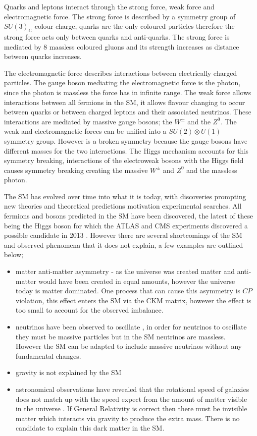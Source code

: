 Quarks and leptons interact through the strong force, weak force and electromagnetic force. The strong force is described by a symmetry group of $SU(3)_{C}$ colour charge, quarks
are the only coloured particles therefore the strong force acts only between quarks and anti-quarks. The strong force is mediated by 8 massless coloured gluons and its strength increases as distance between quarks increases. 

The electromagnetic force describes interactions between electrically charged particles. The gauge boson mediating the electromagnetic force is the photon, since the photon is massless the force
has in infinite range. 
The weak force allows interactions between all fermions in the SM, it allows flavour changing to occur between quarks or between charged leptons and their associated neutrinos. 
These interactions are mediated by massive gauge bosons; the $W^{\pm}$ and the $Z^{0}$. The weak and electromagnetic forces can be unified into a $SU(2) \otimes U(1)$ symmetry group. However 
is a broken symmetry because the gauge bosons have different masses for the two interactions. The Higgs mechanism accounts for this symmetry breaking, interactions of the electroweak bosons
with the Higgs field causes symmetry breaking creating the massive $W^{\pm}$ and $Z^{0}$ and the massless photon. 


The SM has evolved over time into what it is today, with discoveries prompting new theories and theoretical predictions motivation experimental searches. All fermions and bosons predicted in the SM have been discovered, the latest of these being the 
Higgs boson for which the ATLAS and CMS experiments discovered a possible candidate in 2013 \cite{Higgs_ATLAS, Higgs_CMS}. However there are several shortcomings of the SM and 
observed phenomena that it does not explain, a few examples are outlined below;
\begin{itemize}
 \item matter anti-matter asymmetry - as the universe was created matter and anti-matter would have been created in equal amounts, however the universe today is matter dominated. One process
that can cause this asymmetry is $CP$ violation, this effect enters the SM via the CKM matrix, however the effect is too small to account for the observed imbalance. 
 \item neutrinos have been observed to oscillate \cite{Fukuda:2001nk, Fukuda:1998fd, Davis_neutrinos}, in order for neutrinos to oscillate they must be massive particles but in the SM neutrinos are massless. However the SM can be adapted to include massive neutrinos without any fundamental changes.
 \item gravity is not explained by the SM
 \item astronomical observations have revealed that the rotational speed of galaxies does not match up with the speed expect from the amount of matter visible in the universe \cite{1973A&A,Zwicky:1933gu,1937ApJ}. 
If General Relativity is correct then there must be invisible matter which interacts via gravity to produce the extra mass. There is no candidate to explain this dark matter in the SM. 
\end{itemize}


